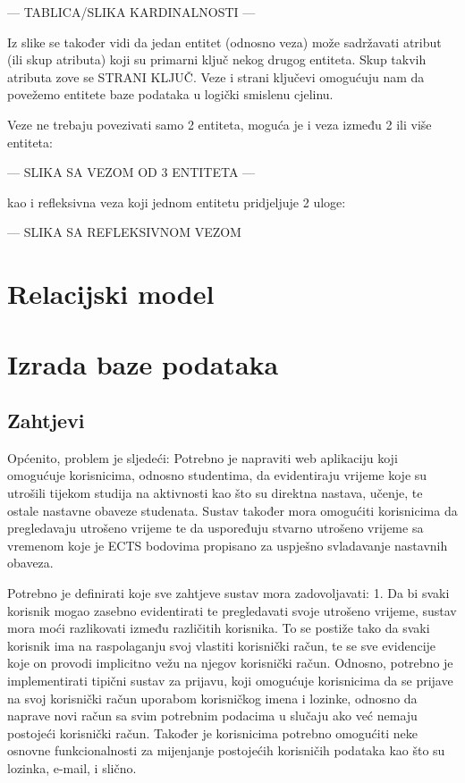 \documentclass[times, utf8, zavrsni]{fer}
\begin{document}
--- TABLICA/SLIKA KARDINALNOSTI ---

Iz slike se također vidi da jedan entitet (odnosno veza) može sadržavati atribut (ili skup atributa) koji su primarni ključ nekog drugog entiteta. Skup takvih atributa zove se STRANI KLJUČ. Veze i strani ključevi omogućuju nam da povežemo entitete baze podataka u logički smislenu cjelinu.

Veze ne trebaju povezivati samo 2 entiteta, moguća je i veza između 2 ili više entiteta:

--- SLIKA SA VEZOM OD 3 ENTITETA ---

kao i refleksivna veza koji jednom entitetu pridjeljuje 2 uloge:

--- SLIKA SA REFLEKSIVNOM VEZOM

\section{Relacijski model}

\section{Izrada baze podataka}
\subsection{Zahtjevi}
Općenito, problem je sljedeći:
Potrebno je napraviti web aplikaciju koji omogućuje korisnicima, odnosno studentima, da evidentiraju vrijeme koje su utrošili tijekom studija na aktivnosti kao što su direktna nastava, učenje, te ostale nastavne obaveze studenata. Sustav također mora omogućiti korisnicima da pregledavaju utrošeno vrijeme te da uspoređuju stvarno utrošeno vrijeme sa vremenom koje je ECTS bodovima propisano za uspješno svladavanje nastavnih obaveza.

Potrebno je definirati koje sve zahtjeve sustav mora zadovoljavati:
1. Da bi svaki korisnik mogao zasebno evidentirati te pregledavati svoje utrošeno vrijeme, sustav mora moći razlikovati između različitih korisnika. To se postiže tako da svaki korisnik ima na raspolaganju svoj vlastiti korisnički račun, te se sve evidencije koje on provodi implicitno vežu na njegov korisnički račun. Odnosno, potrebno je implementirati tipični sustav za prijavu, koji omogućuje korisnicima da se prijave na svoj korisnički račun uporabom korisničkog imena i lozinke, odnosno da naprave novi račun sa svim potrebnim podacima u slučaju ako već nemaju postojeći korisnički račun. Također je korisnicima potrebno omogućiti neke osnovne funkcionalnosti za mijenjanje postojećih korisničih podataka kao što su lozinka, e-mail, i slično.
\end{document}
